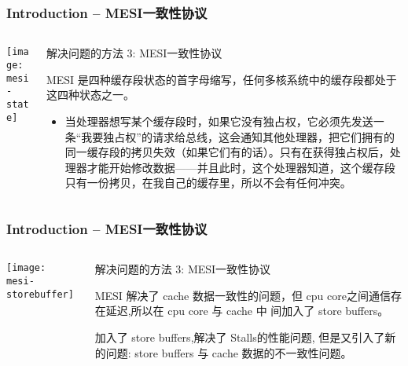 \begin{frame}[plain]	
	\frametitle{Introduction -- MESI一致性协议}
	
	
	\begin{columns}
		
		\begin{column}{.4\textwidth}
			\texttt{[image: mesi-state]}
		\end{column}
		\begin{column}{.6\textwidth}
			解决问题的方法 3: MESI一致性协议
			
			MESI 是四种缓存段状态的首字母缩写，任何多核系统中的缓存段都处于这四种状态之一。
			\begin{itemize}
				
				\item 当处理器想写某个缓存段时，如果它没有独占权，它必须先发送一条“我要独占权”的请求给总线，这会通知其他处理器，把它们拥有的同一缓存段的拷贝失效（如果它们有的话）。只有在获得独占权后，处理器才能开始修改数据——并且此时，这个处理器知道，这个缓存段只有一份拷贝，在我自己的缓存里，所以不会有任何冲突。
			\end{itemize}
			
		\end{column}
	\end{columns}
	
\end{frame}

\begin{frame}[plain]	
    \frametitle{Introduction -- MESI一致性协议}
    
    
    \begin{columns}
        
        \begin{column}{.4\textwidth}
            \texttt{[image: mesi-storebuffer]}
        \end{column}
        \begin{column}{.6\textwidth}
            解决问题的方法 3: MESI一致性协议
            
            MESI 解决了 cache 数据一致性的问题，但
            cpu core之间通信存在延迟,所以在 cpu core 与 cache 中
            间加入了 store buffers。
            
            加入了 store buffers,解决了 Stalls的性能问题, 但是又引入了新的问题:
            store buffers 与 cache 数据的不一致性问题。
            
        \end{column}
    \end{columns}
    
\end{frame}

